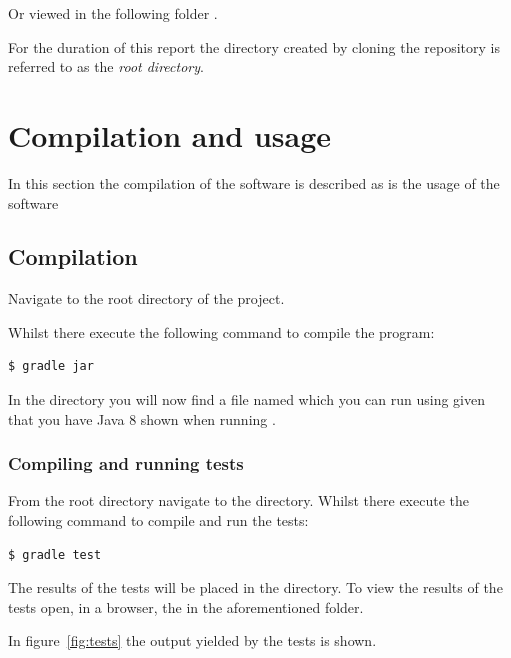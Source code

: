 \documentclass[a4paper]{article}
\begin{document}
Or viewed in the following folder .

For the duration of this report the directory created by cloning
the repository is referred to as the \emph{root directory}.

\section{Compilation and usage}

In this section the compilation of the software is described as
is the usage of the software

\subsection{Compilation}

Navigate to the root directory of the project.

Whilst there execute the following command to compile the program:

\begin{verbatim}
$ gradle jar
\end{verbatim}

In the  directory you will now find a file named
 which you can run using  given that you have Java 8 shown when running
.

\subsubsection{Compiling and running tests}

From the root directory navigate to the  directory.
Whilst there execute the following command to compile and run the tests:

\begin{verbatim}
$ gradle test
\end{verbatim}

The results of the tests will be placed in the 
directory. To view the results of the tests open, in a browser, 
the  in the aforementioned folder.

In figure~\ref{fig:tests} the output yielded by the tests is shown.
\end{document}
